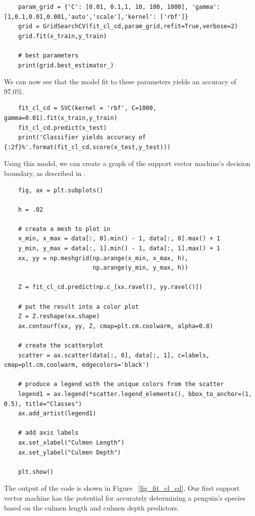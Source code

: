 \documentclass[12pt]{article}
\begin{document}
\begin{verbatim}
    param_grid = {'C': [0.01, 0.1,1, 10, 100, 1000], 'gamma': [1,0.1,0.01,0.001,'auto','scale'],'kernel': ['rbf']}
    grid = GridSearchCV(fit_cl_cd,param_grid,refit=True,verbose=2)
    grid.fit(x_train,y_train)

    # best parameters
    print(grid.best_estimator_)
\end{verbatim}

We can now see that the model fit to these parameters yields an accuracy of 97.0\%.

\begin{verbatim}
    fit_cl_cd = SVC(kernel = 'rbf', C=1000, gamma=0.01).fit(x_train,y_train)
    fit_cl_cd.predict(x_test)
    print('Classifier yields accuracy of {:2f}%'.format(fit_cl_cd.score(x_test,y_test)))
\end{verbatim}

Using this model, we can create a graph of the support vector machine's decision boundary, as described in \cite{scikit_svm_plotting}.

\begin{verbatim}
    fig, ax = plt.subplots()

    h = .02
    
    # create a mesh to plot in
    x_min, x_max = data[:, 0].min() - 1, data[:, 0].max() + 1
    y_min, y_max = data[:, 1].min() - 1, data[:, 1].max() + 1
    xx, yy = np.meshgrid(np.arange(x_min, x_max, h),
                         np.arange(y_min, y_max, h))
    
    Z = fit_cl_cd.predict(np.c_[xx.ravel(), yy.ravel()])
    
    # put the result into a color plot
    Z = Z.reshape(xx.shape)
    ax.contourf(xx, yy, Z, cmap=plt.cm.coolwarm, alpha=0.8)
    
    # create the scatterplot
    scatter = ax.scatter(data[:, 0], data[:, 1], c=labels, cmap=plt.cm.coolwarm, edgecolors='black')
    
    # produce a legend with the unique colors from the scatter
    legend1 = ax.legend(*scatter.legend_elements(), bbox_to_anchor=(1, 0.5), title="Classes")
    ax.add_artist(legend1)
    
    # add axis labels
    ax.set_xlabel("Culmen Length")
    ax.set_ylabel("Culmen Depth")
    
    plt.show()    
\end{verbatim}

The output of the code is shown in Figure ~\ref{fig_fit_cl_cd}. Our first support vector machine has the potential for accurately determining a penguin's species based on the culmen length and culmen depth predictors.
\end{document}
